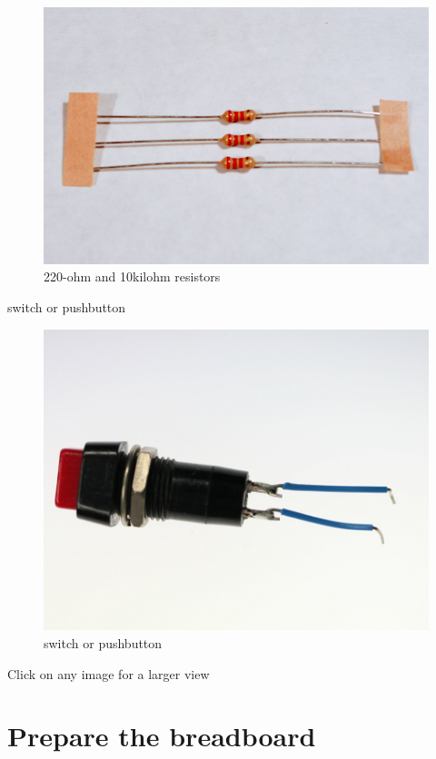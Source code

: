 \begin{figure}[!htb]
 \centering
 \includegraphics[scale=0.3]{img/digitalio/resistors.jpg}
 \caption{220-ohm and 10kilohm resistors}
 \label{220-ohm and 10kilohm resistors}
\end{figure}


switch or pushbutton

\begin{figure}[!htb]
 \centering
 \includegraphics[scale=0.3]{img/digitalio//switch.jpg}
 \caption{switch or pushbutton}
 \label{switch or pushbutton}
\end{figure}

Click on any image for a larger view

\section{Prepare the breadboard}

